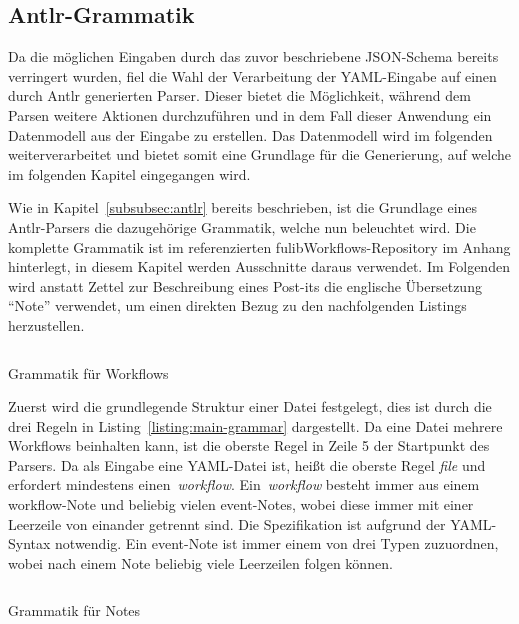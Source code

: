 \subsection{Antlr-Grammatik}\label{subsec:antlr-grammatik}
Da die möglichen Eingaben durch das zuvor beschriebene JSON-Schema bereits verringert wurden, fiel die Wahl der Verarbeitung der YAML-Eingabe auf einen durch Antlr generierten Parser.
Dieser bietet die Möglichkeit, während dem Parsen weitere Aktionen durchzuführen und in dem Fall dieser Anwendung ein Datenmodell aus der Eingabe zu erstellen.
Das Datenmodell wird im folgenden weiterverarbeitet und bietet somit eine Grundlage für die Generierung, auf welche im folgenden Kapitel eingegangen wird.

Wie in Kapitel~\ref{subsubsec:antlr} bereits beschrieben, ist die Grundlage eines Antlr-Parsers die dazugehörige Grammatik, welche nun beleuchtet wird.
Die komplette Grammatik ist im referenzierten fulibWorkflows-Repository im Anhang hinterlegt, in diesem Kapitel werden Ausschnitte daraus verwendet.
Im Folgenden wird anstatt Zettel zur Beschreibung eines Post-its die englische Übersetzung ``Note'' verwendet, um einen direkten Bezug zu den nachfolgenden Listings herzustellen.

\begin{listing}[!ht]
    \inputminted[firstnumber=5]{antlr-java}{listings/3.1.3/Main.g4}
    \caption{Grammatik für Workflows}
    \label{listing:main-grammar}
\end{listing}

Zuerst wird die grundlegende Struktur einer Datei festgelegt, dies ist durch die drei Regeln in Listing~\ref{listing:main-grammar} dargestellt.
Da eine Datei mehrere Workflows beinhalten kann, ist die oberste Regel in Zeile 5 der Startpunkt des Parsers.
Da als Eingabe eine YAML-Datei ist, heißt die oberste Regel \textit{file} und erfordert mindestens einen~\textit{workflow}.
Ein~\textit{workflow} besteht immer aus einem workflow-Note und beliebig vielen event-Notes, wobei diese immer mit einer Leerzeile von einander getrennt sind.
Die Spezifikation ist aufgrund der YAML-Syntax notwendig.
Ein event-Note ist immer einem von drei Typen zuzuordnen, wobei nach einem Note beliebig viele Leerzeilen folgen können.

\begin{listing}[!ht]
    \inputminted[firstnumber=11]{antlr-java}{listings/3.1.3/Note.g4}
    \caption{Grammatik für Notes}
    \label{listing:note-grammar}
\end{listing}

